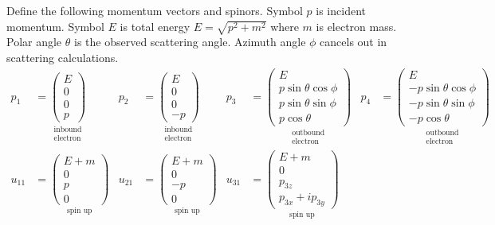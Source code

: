 \documentclass[12pt]{article}
\begin{document}
Define the following momentum vectors and spinors.
Symbol $p$ is incident momentum.
Symbol $E$ is total energy $E=\sqrt{p^2+m^2}$ where $m$ is electron mass.
Polar angle $\theta$ is the observed scattering angle.
Azimuth angle $\phi$ cancels out in scattering calculations.
\iffalse
\begin{align*}
p_1&=
\underset{\substack{\text{inbound}\\\text{electron}}}
{
\begin{pmatrix}E\\0\\0\\p\end{pmatrix}
}
&
p_2&=
\underset{\substack{\text{inbound}\\\text{electron}}}
{
\begin{pmatrix}E\\0\\0\\-p\end{pmatrix}
}
&
p_3&=
\underset{\substack{\text{outbound}\\\text{electron}}}
{
\begin{pmatrix}
E\\
p\sin\theta\cos\phi\\
p\sin\theta\sin\phi\\
p\cos\theta
\end{pmatrix}
}
&
p_4&=
\underset{\substack{\text{outbound}\\\text{electron}}}
{
\begin{pmatrix}
E\\
-p\sin\theta\cos\phi\\
-p\sin\theta\sin\phi\\
-p\cos\theta
\end{pmatrix}
}
\\[1ex]
u_{11}&=
\underset{\text{spin up}}
{\begin{pmatrix}E+m\\0\\p\\0\end{pmatrix}}
&
u_{21}&=
\underset{\text{spin up}}
{\begin{pmatrix}E+m\\0\\-p\\0\end{pmatrix}}
&
u_{31}&=
\underset{\text{spin up}}
{\begin{pmatrix}E+m\\0\\p_{3z}\\p_{3x}+ip_{3y}\end{pmatrix}}

\end{align*}
\end{document}
